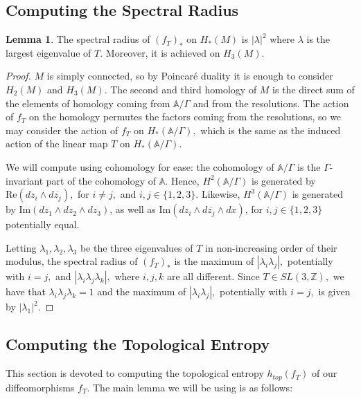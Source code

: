 \documentclass{amsart}
\theoremstyle{theorem}
\theoremstyle{definition}
\theoremstyle{definition}
\theoremstyle{definition}
\theoremstyle{theorem}
\newtheorem{lemma}[theorem]{Lemma}
\theoremstyle{theorem}
\theoremstyle{theorem}
\theoremstyle{corollary}
\theoremstyle{question}
\theoremstyle{remark}
\begin{document}
\subsection{Computing the Spectral Radius}

\begin{lemma}
    The spectral radius of $(f_T)_*$ on $H_*(M)$ is $|\lambda|^2$ where $\lambda$ is the largest eigenvalue of $T.$ Moreover, it is achieved on $H_3(M).$
\end{lemma}

\begin{proof}
    $M$ is simply connected, so by Poincar\'e duality it is enough to consider $H_2(M)$ and $H_3(M).$ The second and third homology of $M$ is the direct sum of the elements of homology coming from $\mathbb{A}/\Gamma$ and from the resolutions. The action of $f_T$ on the homology permutes the factors coming from the resolutions, so we may consider the action of $f_T$ on $H_*(\mathbb{A}/\Gamma),$ which is the same as the induced action of the linear map $T$ on $H_*(\mathbb{A}/\Gamma).$

    We will compute using cohomology for ease: the cohomology of $\mathbb{A}/\Gamma$ is the $\Gamma$-invariant part of the cohomology of $\mathbb{A}.$ Hence, $H^2(\mathbb{A}/\Gamma)$ is generated by $\text{Re}(dz_i\wedge d\overline{z_j}),$ for $i\neq j,$ and $i,j\in\{1,2,3\}$. Likewise, $H^3(\mathbb{A}/\Gamma)$ is generated by $\text{Im}(dz_1\wedge dz_2\wedge dz_3)$, as well as $\text{Im}(dz_i\wedge d\overline{z_j}\wedge dx)$, for $i,j\in\{1,2,3\}$ potentially equal.

    Letting $\lambda_1,\lambda_2, \lambda_3$ be the three eigenvalues of $T$ in non-increasing order of their modulus, the spectral radius of $(f_T)_*$ is the maximum of $|\lambda_i\lambda_j|,$ potentially with $i=j,$ and $|\lambda_i\lambda_j\lambda_k|,$ where $i, j, k$ are all different. Since $T\in SL(3, \mathbb{Z}),$ we have that $\lambda_i\lambda_j\lambda_k=1$ and the maximum of $|\lambda_i\lambda_j|,$ potentially with $i=j,$ is given by $|\lambda_1|^2.$   
\end{proof}

\subsection{Computing the Topological Entropy}


This section is devoted to computing the topological entropy $h_{top}(f_T)$ of our diffeomorphisms $f_T.$ The main lemma we will be using is as follows:
\end{document}
